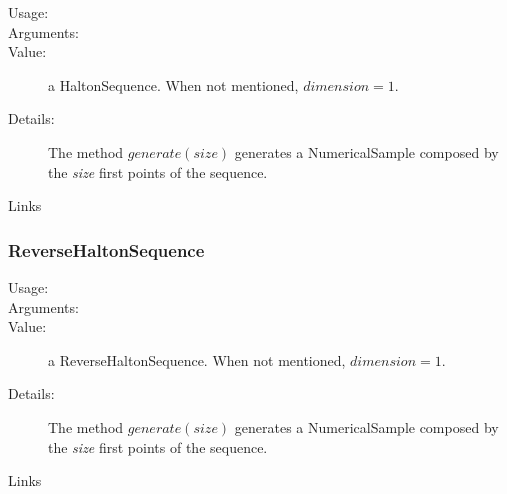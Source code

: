 \begin{description}

\item[Usage:] \rule{0pt}{1em}

\item[Arguments:]  \rule{0pt}{1em}

\item[Value:] a HaltonSequence. When not mentioned, $dimension=1$.

\item[Details:]  The method $generate(size)$ generates a NumericalSample composed by the \textit{size} first points of the sequence.


\item[Links] \rule{0pt}{1em}
\end{description}



\newpage
\subsubsection{ReverseHaltonSequence}

\begin{description}

\item[Usage:] \rule{0pt}{1em}

\item[Arguments:]  \rule{0pt}{1em}

\item[Value:] a ReverseHaltonSequence. When not mentioned, $dimension=1$.

\item[Details:]  The method $generate(size)$ generates a NumericalSample composed by the \textit{size} first points of the sequence.


\item[Links] \rule{0pt}{1em}
\end{description}


